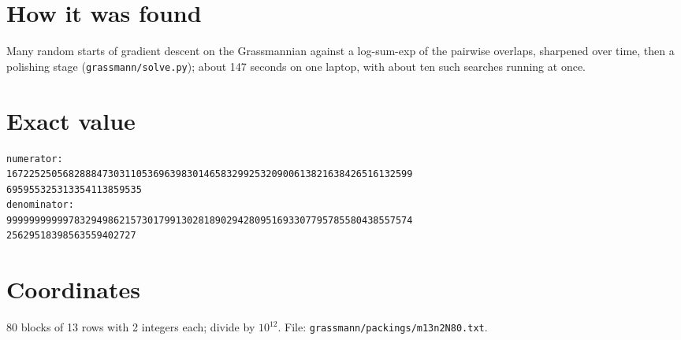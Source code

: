\documentclass[11pt,a4paper]{article}
\begin{document}
\section{How it was found}
Many random starts of gradient descent on the Grassmannian against a log-sum-exp of the pairwise overlaps, sharpened over time, then a polishing stage (\texttt{grassmann/solve.py}); about 147 seconds on one laptop, with about ten such searches running at once.


\appendix
\section{Exact value}
{\small
\begin{verbatim}
numerator:
167225250568288847303110536963983014658329925320900613821638426516132599
695955325313354113859535
denominator:
999999999997832949862157301799130281890294280951693307795785580438557574
25629518398563559402727
\end{verbatim}}

\section{Coordinates}
80 blocks of 13 rows with 2 integers each; divide by $10^{12}$. File: \texttt{grassmann/packings/m13n2N80.txt}.
{\tiny
\begin{multicols}{4}
\end{multicols}}
\end{document}

